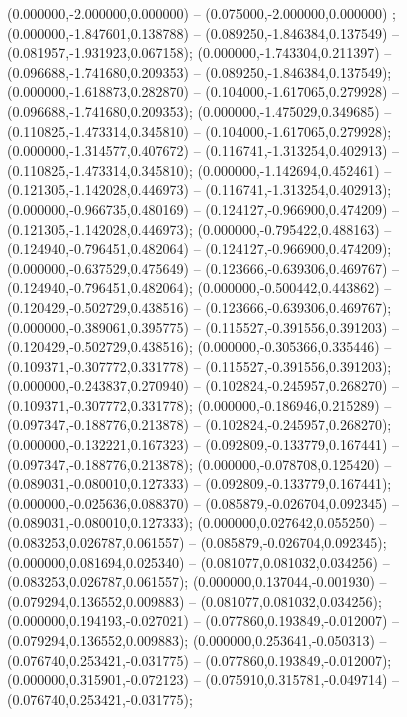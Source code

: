  (0.000000,-2.000000,0.000000) -- (0.075000,-2.000000,0.000000) ;
 (0.000000,-1.847601,0.138788) -- (0.089250,-1.846384,0.137549) -- (0.081957,-1.931923,0.067158);
 (0.000000,-1.743304,0.211397) -- (0.096688,-1.741680,0.209353) -- (0.089250,-1.846384,0.137549);
 (0.000000,-1.618873,0.282870) -- (0.104000,-1.617065,0.279928) -- (0.096688,-1.741680,0.209353);
 (0.000000,-1.475029,0.349685) -- (0.110825,-1.473314,0.345810) -- (0.104000,-1.617065,0.279928);
 (0.000000,-1.314577,0.407672) -- (0.116741,-1.313254,0.402913) -- (0.110825,-1.473314,0.345810);
 (0.000000,-1.142694,0.452461) -- (0.121305,-1.142028,0.446973) -- (0.116741,-1.313254,0.402913);
 (0.000000,-0.966735,0.480169) -- (0.124127,-0.966900,0.474209) -- (0.121305,-1.142028,0.446973);
 (0.000000,-0.795422,0.488163) -- (0.124940,-0.796451,0.482064) -- (0.124127,-0.966900,0.474209);
 (0.000000,-0.637529,0.475649) -- (0.123666,-0.639306,0.469767) -- (0.124940,-0.796451,0.482064);
 (0.000000,-0.500442,0.443862) -- (0.120429,-0.502729,0.438516) -- (0.123666,-0.639306,0.469767);
 (0.000000,-0.389061,0.395775) -- (0.115527,-0.391556,0.391203) -- (0.120429,-0.502729,0.438516);
 (0.000000,-0.305366,0.335446) -- (0.109371,-0.307772,0.331778) -- (0.115527,-0.391556,0.391203);
 (0.000000,-0.243837,0.270940) -- (0.102824,-0.245957,0.268270) -- (0.109371,-0.307772,0.331778);
 (0.000000,-0.186946,0.215289) -- (0.097347,-0.188776,0.213878) -- (0.102824,-0.245957,0.268270);
 (0.000000,-0.132221,0.167323) -- (0.092809,-0.133779,0.167441) -- (0.097347,-0.188776,0.213878);
 (0.000000,-0.078708,0.125420) -- (0.089031,-0.080010,0.127333) -- (0.092809,-0.133779,0.167441);
 (0.000000,-0.025636,0.088370) -- (0.085879,-0.026704,0.092345) -- (0.089031,-0.080010,0.127333);
 (0.000000,0.027642,0.055250) -- (0.083253,0.026787,0.061557) -- (0.085879,-0.026704,0.092345);
 (0.000000,0.081694,0.025340) -- (0.081077,0.081032,0.034256) -- (0.083253,0.026787,0.061557);
 (0.000000,0.137044,-0.001930) -- (0.079294,0.136552,0.009883) -- (0.081077,0.081032,0.034256);
 (0.000000,0.194193,-0.027021) -- (0.077860,0.193849,-0.012007) -- (0.079294,0.136552,0.009883);
 (0.000000,0.253641,-0.050313) -- (0.076740,0.253421,-0.031775) -- (0.077860,0.193849,-0.012007);
 (0.000000,0.315901,-0.072123) -- (0.075910,0.315781,-0.049714) -- (0.076740,0.253421,-0.031775);
